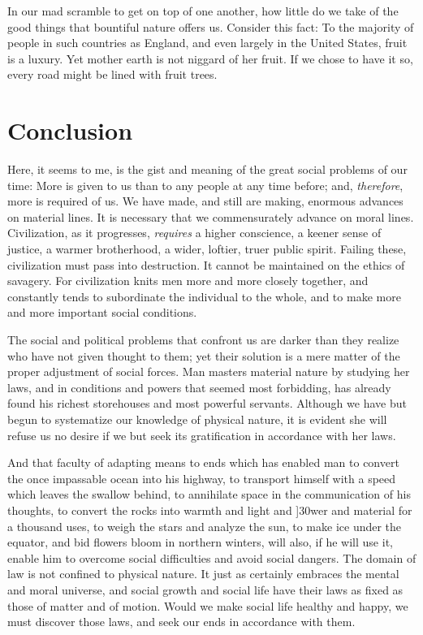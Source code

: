 \documentclass{book}
\begin{document}
In our mad scramble to get on top of one another, how little do we take of the good things that bountiful nature offers us. Consider this fact: To the majority of people in such countries as England, and even largely in the United States, fruit is a luxury. Yet mother earth is not niggard of her fruit. If we chose to have it so, every road might be lined with fruit trees.

\chapter{Conclusion}
\label{chapter-22}
Here, it seems to me, is the gist and meaning of the great social problems of our time: More is given to us than to any people at any time before; and, \emph{therefore}, more is required of us. We have made, and still are making, enormous advances on material lines. It is necessary that we commensurately advance on moral lines. Civilization, as it progresses, \emph{requires} a higher conscience, a keener sense of justice, a warmer brotherhood, a wider, loftier, truer public spirit. Failing these, civilization must pass into destruction. It cannot be maintained on the ethics of savagery. For civilization knits men more and more closely together, and constantly tends to subordinate the individual to the whole, and to make more and more important social conditions.

The social and political problems that confront us are darker than they realize who have not given thought to them; yet their solution is a mere matter of the proper adjustment of social forces. Man masters material nature by studying her laws, and in conditions and powers that seemed most forbidding, has already found his richest storehouses and most powerful servants. Although we have but begun to systematize our knowledge of physical nature, it is evident she will refuse us no desire if we but seek its gratification in accordance with her laws.

And that faculty of adapting means to ends which has enabled man to convert the once impassable ocean into his highway, to transport himself with a speed which leaves the swallow behind, to annihilate space in the communication of his thoughts, to convert the rocks into warmth and light and {]}30wer and material for a thousand uses, to weigh the stars and analyze the sun, to make ice under the equator, and bid flowers bloom in northern winters, will also, if he will use it, enable him to overcome social difficulties and avoid social dangers. The domain of law is not confined to physical nature. It just as certainly embraces the mental and moral universe, and social growth and social life have their laws as fixed as those of matter and of motion. Would we make social life healthy and happy, we must discover those laws, and seek our ends in accordance with them.
\end{document}
